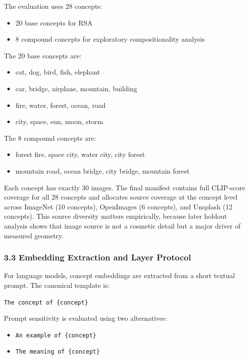 \documentclass[
]{article}
\providecommand{\tightlist}{%
  \setlength{\itemsep}{0pt}\setlength{\parskip}{0pt}}
\begin{document}
The evaluation uses 28 concepts:

\begin{itemize}
\tightlist
\item
  20 base concepts for RSA
\item
  8 compound concepts for exploratory compositionality analysis
\end{itemize}

The 20 base concepts are:

\begin{itemize}
\tightlist
\item
  cat, dog, bird, fish, elephant
\item
  car, bridge, airplane, mountain, building
\item
  fire, water, forest, ocean, road
\item
  city, space, sun, moon, storm
\end{itemize}

The 8 compound concepts are:

\begin{itemize}
\tightlist
\item
  forest fire, space city, water city, city forest
\item
  mountain road, ocean bridge, city bridge, mountain forest
\end{itemize}

Each concept has exactly 30 images. The final manifest contains full
CLIP-score coverage for all 28 concepts and allocates source coverage at
the concept level across ImageNet (10 concepts), OpenImages (6
concepts), and Unsplash (12 concepts). This source diversity matters
empirically, because later holdout analysis shows that image source is
not a cosmetic detail but a major driver of measured geometry.

\subsubsection{3.3 Embedding Extraction and Layer
Protocol}\label{embedding-extraction-and-layer-protocol}

For language models, concept embeddings are extracted from a short
textual prompt. The canonical template is:

\texttt{The\ concept\ of\ \{concept\}}

Prompt sensitivity is evaluated using two alternatives:

\begin{itemize}
\tightlist
\item
  \texttt{An\ example\ of\ \{concept\}}
\item
  \texttt{The\ meaning\ of\ \{concept\}}
\end{itemize}
\end{document}
